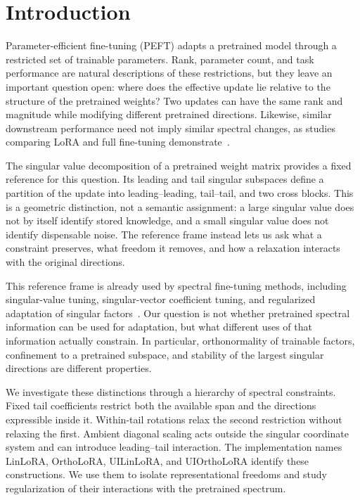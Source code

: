\section{Introduction}
\label{sec:intro}

Parameter-efficient fine-tuning (PEFT) adapts a pretrained model through a restricted set of trainable parameters. Rank, parameter count, and task performance are natural descriptions of these restrictions, but they leave an important question open: where does the effective update lie relative to the structure of the pretrained weights? Two updates can have the same rank and magnitude while modifying different pretrained directions. Likewise, similar downstream performance need not imply similar spectral changes, as studies comparing LoRA and full fine-tuning demonstrate~\citep{hu2022lora,shuttleworth2025illusion}.

The singular value decomposition of a pretrained weight matrix provides a fixed reference for this question. Its leading and tail singular subspaces define a partition of the update into leading--leading, tail--tail, and two cross blocks. This is a geometric distinction, not a semantic assignment: a large singular value does not by itself identify stored knowledge, and a small singular value does not identify dispensable noise. The reference frame instead lets us ask what a constraint preserves, what freedom it removes, and how a relaxation interacts with the original directions.

This reference frame is already used by spectral fine-tuning methods, including singular-value tuning, singular-vector coefficient tuning, and regularized adaptation of singular factors~\citep{han2023svdiff,lingam2024svft,cao2025sorsa}. Our question is not whether pretrained spectral information can be used for adaptation, but what different uses of that information actually constrain. In particular, orthonormality of trainable factors, confinement to a pretrained subspace, and stability of the largest singular directions are different properties.

We investigate these distinctions through a hierarchy of spectral constraints. Fixed tail coefficients restrict both the available span and the directions expressible inside it. Within-tail rotations relax the second restriction without relaxing the first. Ambient diagonal scaling acts outside the singular coordinate system and can introduce leading--tail interaction. The implementation names LinLoRA, OrthoLoRA, UILinLoRA, and UIOrthoLoRA identify these constructions. We use them to isolate representational freedoms and study regularization of their interactions with the pretrained spectrum.

